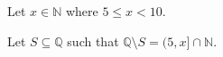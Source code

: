 \documentclass{article}
\begin{document}
Let $x \in \mathbb{N}$ where $5 \leq x < 10$.

Let $S \subseteq \mathbb{Q}$ such that $\mathbb{Q} \setminus S = (5, x] \cap \mathbb{N}$.
\end{document}
